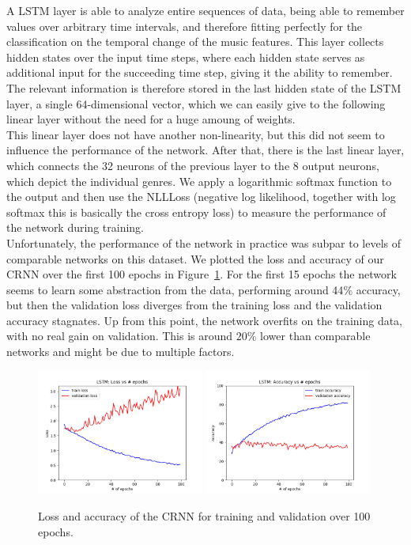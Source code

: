     A LSTM layer is able to analyze entire sequences of data, being able to remember values over arbitrary time intervals, and therefore fitting perfectly for the classification on the temporal change of the music features.
    This layer collects hidden states over the input time steps, where each hidden state serves as additional input for the succeeding time step, giving it the ability to remember.
    The relevant information is therefore stored in the last hidden state of the LSTM layer, a single 64-dimensional vector, which we can easily give to the following linear layer without the need for a huge amoung of weights.\\
    This linear layer does not have another non-linearity, but this did not seem to influence the performance of the network.
    After that, there is the last linear layer, which connects the 32 neurons of the previous layer to the 8 output neurons, which depict the individual genres.
    We apply a logarithmic softmax function to the output and then use the NLLLoss (negative log likelihood, together with log softmax this is basically the cross entropy loss) to measure the performance of the network during training.\\
    Unfortunately, the performance of the network in practice was subpar to levels of comparable networks on this dataset.
    We plotted the loss and accuracy of our CRNN over the first 100 epochs in Figure~\ref{performance}.
    For the first 15 epochs the network seems to learn some abstraction from the data, performing around 44$\%$ accuracy, but then the validation loss diverges from the training loss and the validation accuracy stagnates.
    Up from this point, the network overfits on the training data, with no real gain on validation.
    This is around $20\%$ lower than comparable networks and might be due to multiple factors.
    \\

    \begin{figure}[b]
        \centering
        \includegraphics[width=0.49\textwidth]{images/loss}
        \includegraphics[width=0.49\textwidth]{images/acc}
        \caption{Loss and accuracy of the CRNN for training and validation over 100 epochs.}
        \label{performance}
    \end{figure}